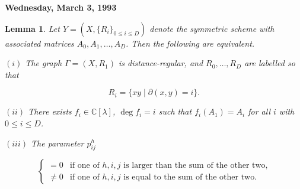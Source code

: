 \documentclass[
]{book}
\newtheorem{lemma}{Lemma}[chapter]
\theoremstyle{definition}
\theoremstyle{definition}
\theoremstyle{definition}
\theoremstyle{definition}
\theoremstyle{remark}
\begin{document}
\textbf{Wednesday, March 3, 1993}

\begin{lemma}
\protect\hypertarget{lem:dr-scheme}{}\label{lem:dr-scheme}Let \(Y = (X, \{R_i\}_{0\leq i\leq D})\) denote the symmetric scheme with associated matrices \(A_0, A_1, \ldots, A_D\). Then the following are equivalent.

\((i)\) The graph \(\Gamma = (X, R_1)\) is distance-regular, and \(R_0, \ldots, R_D\) are labelled so that

\[R_i = \{xy\mid \partial(x,y) = i\}.\]

\((ii)\) There exists \(f_i\in \mathbb{C}[\lambda]\), \(\deg f_i = i\) such that \(f_i(A_1) = A_i\) for all \(i\) with \(0\leq i\leq D\).

\((iii)\) The parameter \(p^h_{ij}\)

\[\begin{cases} = 0 & \text{if one of $h, i, j$ is larger than the sum of the other two,}\\
\neq 0 & \text{if one of $h,i,j$ is equal to the sum of the other two.}\end{cases}\]
\end{lemma}
\end{document}
